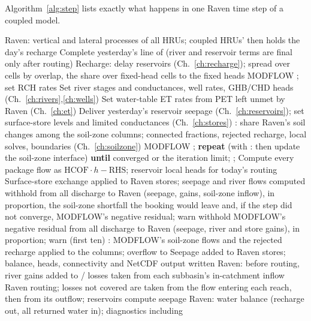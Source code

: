 Algorithm~\ref{alg:step} lists exactly what happens in one Raven time step of a coupled model.

\begin{algorithm}[!htbp]\caption{One coupled time step}\label{alg:step}
\begin{algorithmic}[1]
\State Raven: vertical and lateral processes of all HRUs; coupled HRUs'  then holds the day's recharge
\State Complete yesterday's line of  (river and reservoir terms are final only after routing)
\State Recharge: delay reservoirs (Ch.~\ref{ch:recharge}); spread over cells by overlap, the share over fixed-head cells to the fixed heads
\State MODFLOW ; set RCH rates
\State Set river stages and conductances, well rates, GHB/CHD heads (Ch.~\ref{ch:rivers},\ref{ch:wells})
\State Set water-table ET rates from PET left unmet by Raven (Ch.~\ref{ch:et})
\State Deliver yesterday's reservoir seepage (Ch.~\ref{ch:reservoirs}); set surface-store levels and limited conductances (Ch.~\ref{ch:stores})
\State {}: share Raven's soil changes among the soil-zone columns; connected fractions, rejected recharge, local solves,  boundaries (Ch.~\ref{ch:soilzone})
\State MODFLOW ; \textbf{repeat}  (with : then update the soil-zone interface) \textbf{until} converged or the iteration limit; ; 
\State Compute every package flow as $\mathrm{HCOF}\cdot h-\mathrm{RHS}$; reservoir local heads for today's routing
\State Surface-store exchange applied to Raven stores; seepage and river flows computed
 withhold from all discharge to Raven (seepage, gains, soil-zone inflow), in proportion, the soil-zone shortfall the booking would leave and, if the step did not converge, MODFLOW's negative residual; warn
 withhold MODFLOW's negative residual from all discharge to Raven (seepage, river and store gains), in proportion; warn (first ten) \EndIf
\State {}: MODFLOW's soil-zone flows and the rejected recharge applied to the columns; overflow to 
\State Seepage added to Raven stores; balance, heads, connectivity and NetCDF output written
\State Raven: before routing, river gains added to / losses taken from each subbasin's in-catchment inflow
\State Raven routing; losses not covered are taken from the flow entering each reach, then from its outflow; reservoirs compute seepage
\State Raven: water balance (recharge out, all returned water in); diagnostics including 
\end{algorithmic}
\end{algorithm}

